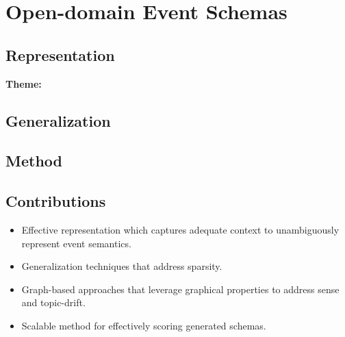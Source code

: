 \section{Open-domain Event Schemas}

\subsection{Representation}

\textbf{Theme:} 

\subsection{Generalization}

\subsection{Method}

\subsection{Contributions}

\begin{itemize}
\item Effective representation which captures adequate context to unambiguously represent event semantics. 
\item Generalization techniques that address sparsity. 
\item Graph-based approaches that leverage graphical properties to address sense and topic-drift. 
\item Scalable method for effectively scoring generated schemas. 
\end{itemize}


